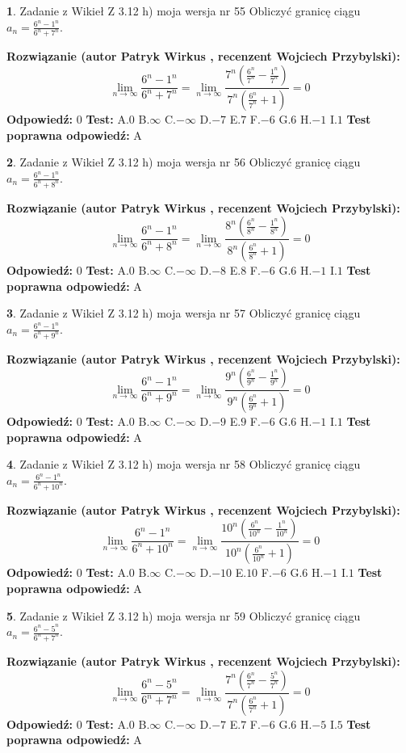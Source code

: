 \documentclass[12pt, a4paper]{article}
\theoremstyle{definition} %
\newtheorem{zad}{}
\newcommand{\zadStart}[1]{\begin{zad}#1\newline}
\newcommand{\zadStop}{\end{zad}}
\newcommand{\rozwStart}[2]{\noindent \textbf{Rozwiązanie (autor #1 , recenzent #2): }\newline}
\newcommand{\rozwStop}{\newline}
\newcommand{\odpStart}{\noindent \textbf{Odpowiedź:}\newline}
\newcommand{\odpStop}{\newline}
\newcommand{\testStart}{\noindent \textbf{Test:}\newline}
\newcommand{\testStop}{\newline}
\newcommand{\kluczStart}{\noindent \textbf{Test poprawna odpowiedź:}\newline}
\newcommand{\kluczStop}{\newline}
\begin{document}
\zadStart{Zadanie z Wikieł Z 3.12 h) moja wersja nr 55}
Obliczyć granicę ciągu $a_{n}=\frac{6^{n} - 1^{n}}{6^{n} + 7^{n}}$.
\zadStop
\rozwStart{Patryk Wirkus}{Wojciech Przybylski}
$$\lim\limits_{n\to\infty}\frac{6^{n} - 1^{n}}{6^{n} + 7^{n}} = \lim\limits_{n\to\infty}\frac{7^{n}(\frac{6^{n}}{7^{n}} - \frac{1^{n}}{7^{n}})}{7^{n}(\frac{6^{n}}{7^{n}} + 1)} = 0$$
\rozwStop
\odpStart
$0$
\odpStop
\testStart
A.$0$
B.$\infty$
C.$-\infty$
D.$-7$
E.$7$
F.$-6$
G.$6$
H.$-1$
I.$1$
\testStop
\kluczStart
A
\kluczStop



\zadStart{Zadanie z Wikieł Z 3.12 h) moja wersja nr 56}
Obliczyć granicę ciągu $a_{n}=\frac{6^{n} - 1^{n}}{6^{n} + 8^{n}}$.
\zadStop
\rozwStart{Patryk Wirkus}{Wojciech Przybylski}
$$\lim\limits_{n\to\infty}\frac{6^{n} - 1^{n}}{6^{n} + 8^{n}} = \lim\limits_{n\to\infty}\frac{8^{n}(\frac{6^{n}}{8^{n}} - \frac{1^{n}}{8^{n}})}{8^{n}(\frac{6^{n}}{8^{n}} + 1)} = 0$$
\rozwStop
\odpStart
$0$
\odpStop
\testStart
A.$0$
B.$\infty$
C.$-\infty$
D.$-8$
E.$8$
F.$-6$
G.$6$
H.$-1$
I.$1$
\testStop
\kluczStart
A
\kluczStop



\zadStart{Zadanie z Wikieł Z 3.12 h) moja wersja nr 57}
Obliczyć granicę ciągu $a_{n}=\frac{6^{n} - 1^{n}}{6^{n} + 9^{n}}$.
\zadStop
\rozwStart{Patryk Wirkus}{Wojciech Przybylski}
$$\lim\limits_{n\to\infty}\frac{6^{n} - 1^{n}}{6^{n} + 9^{n}} = \lim\limits_{n\to\infty}\frac{9^{n}(\frac{6^{n}}{9^{n}} - \frac{1^{n}}{9^{n}})}{9^{n}(\frac{6^{n}}{9^{n}} + 1)} = 0$$
\rozwStop
\odpStart
$0$
\odpStop
\testStart
A.$0$
B.$\infty$
C.$-\infty$
D.$-9$
E.$9$
F.$-6$
G.$6$
H.$-1$
I.$1$
\testStop
\kluczStart
A
\kluczStop



\zadStart{Zadanie z Wikieł Z 3.12 h) moja wersja nr 58}
Obliczyć granicę ciągu $a_{n}=\frac{6^{n} - 1^{n}}{6^{n} + 10^{n}}$.
\zadStop
\rozwStart{Patryk Wirkus}{Wojciech Przybylski}
$$\lim\limits_{n\to\infty}\frac{6^{n} - 1^{n}}{6^{n} + 10^{n}} = \lim\limits_{n\to\infty}\frac{10^{n}(\frac{6^{n}}{10^{n}} - \frac{1^{n}}{10^{n}})}{10^{n}(\frac{6^{n}}{10^{n}} + 1)} = 0$$
\rozwStop
\odpStart
$0$
\odpStop
\testStart
A.$0$
B.$\infty$
C.$-\infty$
D.$-10$
E.$10$
F.$-6$
G.$6$
H.$-1$
I.$1$
\testStop
\kluczStart
A
\kluczStop



\zadStart{Zadanie z Wikieł Z 3.12 h) moja wersja nr 59}
Obliczyć granicę ciągu $a_{n}=\frac{6^{n} - 5^{n}}{6^{n} + 7^{n}}$.
\zadStop
\rozwStart{Patryk Wirkus}{Wojciech Przybylski}
$$\lim\limits_{n\to\infty}\frac{6^{n} - 5^{n}}{6^{n} + 7^{n}} = \lim\limits_{n\to\infty}\frac{7^{n}(\frac{6^{n}}{7^{n}} - \frac{5^{n}}{7^{n}})}{7^{n}(\frac{6^{n}}{7^{n}} + 1)} = 0$$
\rozwStop
\odpStart
$0$
\odpStop
\testStart
A.$0$
B.$\infty$
C.$-\infty$
D.$-7$
E.$7$
F.$-6$
G.$6$
H.$-5$
I.$5$
\testStop
\kluczStart
A
\kluczStop
\end{document}
